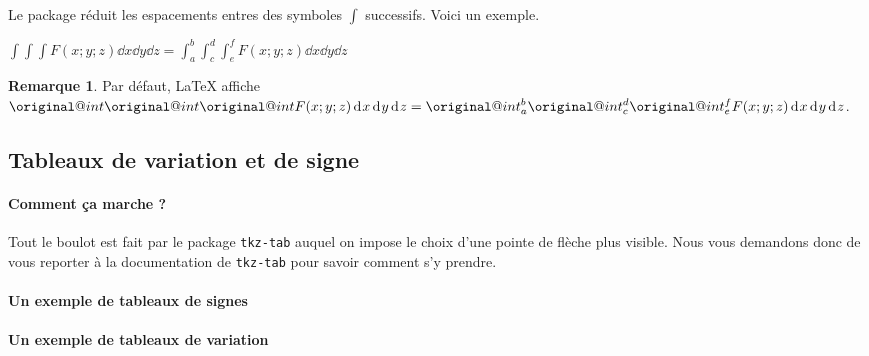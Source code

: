 \documentclass[12pt,a4paper]{article}
\theoremstyle{definition}
\newtheorem*{remark}{Remarque}
\begin{document}
Le package réduit les espacements entres des symboles $\int$ successifs. Voici un exemple.

\begin{tcblisting}{}
$\displaystyle
  \int \int \int F(x;y;z) \dd{x} \dd{y} \dd{z}
= \int_{a}^{b} \int_{c}^{d} \int_{e}^{f} F(x;y;z) \dd{x} \dd{y} \dd{z}$
\end{tcblisting}


\begin{remark}
	Par défaut, \LaTeX{} affiche
	\makeatletter
    	$\displaystyle \original@int \original@int \original@int F(x;y;z) \dd{x} \dd{y} \dd{z}
    	= \original@int_{a}^{b} \original@int_{c}^{d} \original@int_{e}^{f} F(x;y;z) \dd{x} \dd{y} \dd{z}$.
	\makeatother
\end{remark}





    \subsection{Tableaux de variation et de signe}

            \paragraph{Comment ça marche ?}

Tout le boulot est fait par le package \verb+tkz-tab+ auquel on impose le choix d'une pointe de flèche plus visible. Nous vous demandons donc de vous reporter à la documentation de \verb+tkz-tab+ pour savoir comment s'y prendre.


            \paragraph{Un exemple de tableaux de signes}

\begin{tcblisting}{}
\end{tcblisting}


            \paragraph{Un exemple de tableaux de variation}
\end{document}
